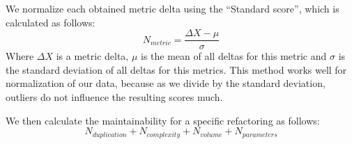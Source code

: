 We normalize each obtained metric delta using the ``Standard score'', which is calculated as follows:
\begin{equation}\label{eq:scoredev}
N_{metric} = \frac {\Delta X-\mu}{\sigma}
\end{equation}
Where $\Delta X$ is a metric delta, $\mu$ is the mean of all deltas for this metric and $\sigma$ is the standard deviation of all deltas for this metrics. This method works well for normalization of our data, because as we divide by the standard deviation, outliers do not influence the resulting scores much.

We then calculate the maintainability for a specific refactoring as follows:
\begin{equation}\label{eq:scoreref}
N_{duplication} + N_{complexity} + N_{volume} + N_{parameters}
\end{equation}
